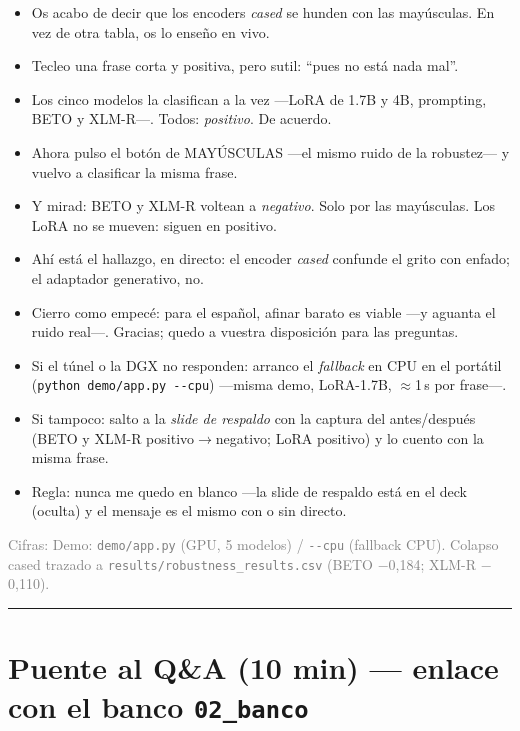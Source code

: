 \documentclass[11pt,a4paper]{article}
\newcommand{\fuente}[1]{\par{\footnotesize\textcolor{gray}{Cifras: #1}}\par}
\newenvironment{decir}{\begin{itemize}[label=\textbf{--},leftmargin=1.3em,itemsep=2.5pt,topsep=3pt]}{\end{itemize}}
\begin{document}
\begin{decir}
  \item Os acabo de decir que los encoders \emph{cased} se hunden con las mayúsculas. En vez de otra tabla, os lo enseño en vivo.
  \item Tecleo una frase corta y positiva, pero sutil: ``pues no está nada mal''.
  \item Los cinco modelos la clasifican a la vez ---LoRA de 1.7B y 4B, prompting, BETO y XLM-R---. Todos: \emph{positivo}. De acuerdo.
  \item Ahora pulso el botón de MAYÚSCULAS ---el mismo ruido de la robustez--- y vuelvo a clasificar la misma frase.
  \item Y mirad: BETO y XLM-R voltean a \emph{negativo}. Solo por las mayúsculas. Los LoRA no se mueven: siguen en positivo.
  \item Ahí está el hallazgo, en directo: el encoder \emph{cased} confunde el grito con enfado; el adaptador generativo, no.
  \item Cierro como empecé: para el español, afinar barato es viable ---y aguanta el ruido real---. Gracias; quedo a vuestra disposición para las preguntas.
\end{decir}

\begin{decir}
  \item Si el túnel o la DGX no responden: arranco el \emph{fallback} en CPU en el portátil (\texttt{python demo/app.py -{}-cpu}) ---misma demo, LoRA-1.7B, $\approx$1\,s por frase---.
  \item Si tampoco: salto a la \emph{slide de respaldo} con la captura del antes/después (BETO y XLM-R positivo$\rightarrow$negativo; LoRA positivo) y lo cuento con la misma frase.
  \item Regla: nunca me quedo en blanco ---la slide de respaldo está en el deck (oculta) y el mensaje es el mismo con o sin directo.
\end{decir}
\fuente{Demo: \texttt{demo/app.py} (GPU, 5 modelos) / \texttt{-{}-cpu} (fallback CPU). Colapso cased trazado a \texttt{results/robustness\_results.csv} (BETO $-$0,184; XLM-R $-$0,110).}

\bigskip\noindent\rule{\linewidth}{0.8pt}
\section*{Puente al Q\&A (10 min) --- enlace con el banco \texttt{02\_banco}}
\end{document}

